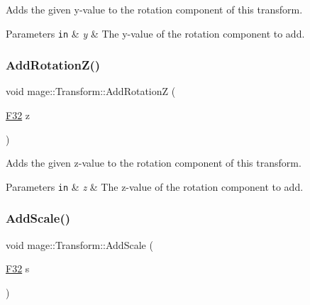Adds the given y-\/value to the rotation component of this transform.


\begin{DoxyParams}[1]{Parameters}
\mbox{\tt in}  & {\em y} & The y-\/value of the rotation component to add. \\
\hline
\end{DoxyParams}
\hypertarget{structmage_1_1_transform_a973e713992328de9f5ad3b6ed4779f40}{}\label{structmage_1_1_transform_a973e713992328de9f5ad3b6ed4779f40} 
\subsubsection{\texorpdfstring{Add\+Rotation\+Z()}{AddRotationZ()}}
{\footnotesize\ttfamily void mage\+::\+Transform\+::\+Add\+RotationZ (\begin{DoxyParamCaption}\item[{\hyperlink{namespacemage_aa97e833b45f06d60a0a9c4fc22ae02c0}{F32}}]{z }\end{DoxyParamCaption})\hspace{0.3cm}{\ttfamily [noexcept]}}

Adds the given z-\/value to the rotation component of this transform.


\begin{DoxyParams}[1]{Parameters}
\mbox{\tt in}  & {\em z} & The z-\/value of the rotation component to add. \\
\hline
\end{DoxyParams}
\hypertarget{structmage_1_1_transform_a3b90baf1db39dd3dc17a9203b4383073}{}\label{structmage_1_1_transform_a3b90baf1db39dd3dc17a9203b4383073} 
\subsubsection{\texorpdfstring{Add\+Scale()}{AddScale()}\hspace{0.1cm}{\footnotesize\ttfamily [1/4]}}
{\footnotesize\ttfamily void mage\+::\+Transform\+::\+Add\+Scale (\begin{DoxyParamCaption}\item[{\hyperlink{namespacemage_aa97e833b45f06d60a0a9c4fc22ae02c0}{F32}}]{s }\end{DoxyParamCaption})\hspace{0.3cm}{\ttfamily [noexcept]}}


